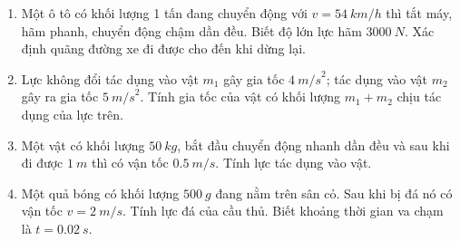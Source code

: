 \begin{enumerate}[label=\bfseries Câu \arabic*:]
		\item {}
	
	{
		
		Một ô tô có khối lượng 1 tấn đang chuyển động với $v = \SI{54}{km/h}$ thì tắt máy, hãm phanh, chuyển động chậm dần đều. Biết độ lớn lực hãm $\SI{3000}{N}$. Xác định quãng đường xe đi được cho đến khi dừng lại.
	}
	
	
	\item {}
	
	{
		
		Lực không đổi tác dụng vào vật $m_1$ gây gia tốc $\SI{4}{m/s}^2$; tác dụng vào vật $m_2$ gây ra gia tốc $\SI{5}{m/s}^2.$ Tính gia tốc của vật có khối lượng $m_1 + m_2$ chịu tác dụng của lực trên.
	}
	
	\item {}
	
	{
		Một vật có khối lượng $\SI{50}{kg}$, bắt đầu chuyển động nhanh dần đều và sau khi đi được $\SI{1}{m}$ thì có vận tốc $\SI{0,5}{m/s}$. Tính lực tác dụng vào vật.
	}
	
	\item {}
	
	{
		Một quả bóng có khối lượng $\SI{500}{g}$ đang nằm trên sân cỏ. Sau khi bị đá nó có vận tốc $v = \SI{2}{m/s}$. Tính lực đá của cầu thủ. Biết khoảng thời gian va chạm là $t = \SI{0,02}{s}$.
	}
	
\end{enumerate}

